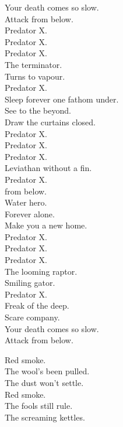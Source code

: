 Your death comes so slow. \\
Attack from below. \\

Predator X. \\
Predator X. \\
Predator X. \\
The terminator. \\
Turns to vapour. \\
Predator X. \\
Sleep forever one fathom under. \\

See to the beyond. \\
Draw the curtains closed. \\

Predator X. \\
Predator X. \\
Predator X. \\
Leviathan without a fin. \\
Predator X. \\
 from below. \\
Water hero. \\

Forever alone. \\
Make you a new home. \\

Predator X. \\
Predator X. \\
Predator X. \\
The looming raptor. \\
Smiling gator. \\
Predator X. \\
Freak of the deep. \\
Scare company. \\

Your death comes so slow. \\
Attack from below. \\




Red smoke. \\
The wool's been pulled. \\
The dust won't settle. \\
Red smoke. \\
The fools still rule. \\
The screaming kettles. \\

